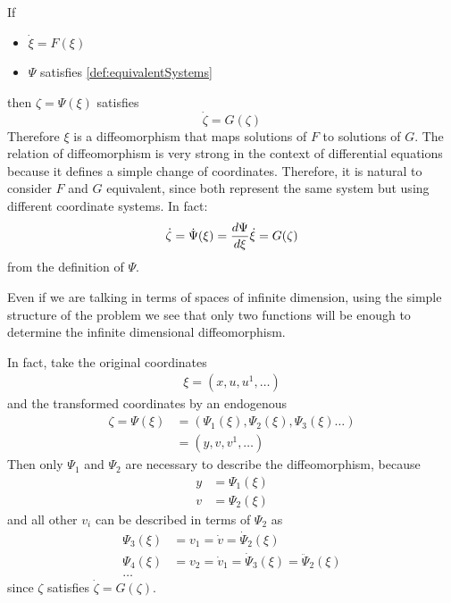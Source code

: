 \documentclass[12pt]{article}
\begin{document}
\begin{remark}
  If 
  \begin{itemize}
    \item $\dot{\xi} = F(\xi)$
    \item $\Psi$ satisfies \ref{def:equivalentSystems}
  \end{itemize}    
  then $\zeta = \Psi(\xi)$ satisfies
  \[ \dot{\zeta} = G(\zeta) \]
  Therefore $\xi$ is a diffeomorphism that maps solutions of $F$ to solutions of $G$.
  The relation of diffeomorphism is very strong in the context of differential
  equations because it defines a simple change of coordinates. Therefore, it is
  natural to consider $F$ and $G$ equivalent, since both represent the same system
  but using different coordinate systems.
  In fact:
  \[ \dot{\zeta} = \dot{\Psi}(\xi) = \frac{d\Psi}{d\xi}\dot{\xi} = G(\zeta) \]
  from the definition of $\Psi$.
\end{remark}

\begin{remark} \label{rem:twoFunctionsDetermineEquivalence}
  
  Even if we are talking in terms of spaces of infinite dimension, using the simple
  structure of the problem we see that only two functions will be enough to
  determine the infinite dimensional diffeomorphism.
  
  In fact,   take the original coordinates
  \begin{align*}
    \xi = (x, u, u^1, \ldots)
  \end{align*}
  and the transformed coordinates by an endogenous
  \begin{align*}
    \zeta 
    = \Psi(\xi) 
    &= (\Psi_1(\xi), \Psi_2(\xi), \Psi_3(\xi) \ldots) \\
    &= (y, v, v^1, \ldots)
  \end{align*}
  Then only $\Psi_1$ and $\Psi_2$ are necessary to describe the diffeomorphism, because
  \begin{align*}
    y &= \Psi_1(\xi) \\
    v &= \Psi_2(\xi)
  \end{align*}
  and all other $v_i$ can be described in terms of $\Psi_2$ as
  \begin{align*}
    \Psi_3(\xi) &= v_1 = \dot{v} = \dot{\Psi}_2(\xi) \\
    \Psi_4(\xi) &= v_2 = \dot{v}_1 = \dot{\Psi}_3(\xi) = \ddot{\Psi}_2(\xi) \\
    \ldots  
  \end{align*}
  since $\zeta$ satisfies $\dot{\zeta}=G(\zeta)$.  
\end{remark}
\end{document}
